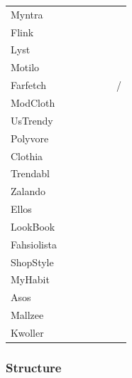 \documentclass{beamer}
\newcommand{\cmark}{\color{ForestGreen}\ding{52}} %
\newcommand{\xmark}{\color{RedOrange}\ding{55}}   %
\begin{document}
\begin{frame}
\begin{table}[H]
{\begin{tabular}{lllllll}
                Myntra  & \cmark & \cmark & \cmark & \cmark & \xmark & \xmark \\
                Flink   & \xmark & \cmark & \cmark & \cmark & \cmark & \xmark \\
                Lyst    & \xmark & \cmark & \cmark & \cmark & \cmark & \xmark \\
                Motilo  & \xmark & \cmark & \xmark & \cmark & \cmark & \xmark \\
                Farfetch & \cmark & \cmark & \cmark & \cmark & \xmark & \xmark/\cmark \\
                ModCloth  & \cmark & \cmark & \cmark & \cmark & \xmark & \xmark \\
                UsTrendy  & \cmark & \cmark & \cmark & \cmark & \xmark & \xmark \\
                Polyvore  & \xmark & \cmark & \cmark & \cmark & \cmark & \xmark \\
                Clothia  & \xmark & \cmark & \cmark & \cmark & \cmark & \xmark \\
                Trendabl  & \cmark & \cmark & \cmark & \cmark & \cmark & \xmark \\
                Zalando  & \cmark & \cmark & \cmark & \cmark & \xmark & \xmark \\
                Ellos  & \cmark & \cmark & \cmark & \cmark & \xmark & \xmark \\
                LookBook  & \xmark & \cmark & \cmark & \cmark & \cmark & \xmark \\
                Fahsiolista  & \xmark & \cmark & \xmark & \cmark & \cmark & \xmark \\
                ShopStyle  & \xmark & \xmark & \cmark & \cmark & \xmark & \xmark \\
                MyHabit  & \cmark & \xmark & \cmark & \xmark & \xmark & \xmark \\
                Asos  & \cmark & \cmark & \cmark & \cmark & \cmark & \xmark \\
                Mallzee  & \xmark & \xmark & \xmark & \cmark & \cmark & \cmark \\
                Kwoller  & \xmark & \xmark & \xmark & \cmark & \xmark & \cmark \\
                \bottomrule
            \end{tabular}
          }
      \end{table}
  \end{frame}

  \begin{frame}
    \frametitle{Structure}
    \tableofcontents
  \end{frame}
\end{document}

